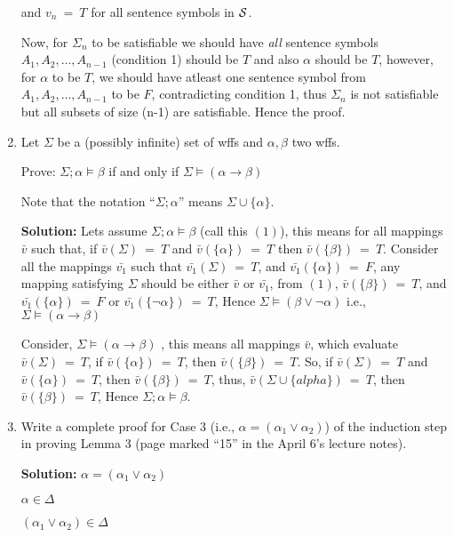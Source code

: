 \documentclass[12pt,letterpaper]{article}
\begin{document}
\begin{enumerate}
  and $v_{n}\ =\ T$ for all sentence symbols in $\cal S$.
  
  Now, for $\Sigma_{n}$ to be satisfiable we should have \textit{all} sentence symbols $A_{1}, A_{2},...,A_{n-1}$ (condition 1) should be $T$ and also $\alpha$ should be $T$, however, for $\alpha$ to be $T$, we should have atleast one sentence symbol from  $A_{1}, A_{2},...,A_{n-1}$ to be $F$, contradicting condition 1, thus $\Sigma_{n}$ is not satisfiable but all subsets of size (n-1) are satisfiable. Hence the proof.
  	
  

\item
  Let $\Sigma$ be a (possibly infinite) set of wffs and
  $\alpha,\beta$ two wffs.

  Prove: $\Sigma;\alpha\models\beta$ if and only if
  $\Sigma\models (\alpha\rightarrow\beta)$

  Note that the notation ``$\Sigma;\alpha$'' means $\Sigma\cup\{\alpha\}$.
  
  \textbf{Solution:} Lets assume $\Sigma;\alpha\models\beta$  (call this $(1)$), this means for all mappings $\bar{v}$ such that, if $\bar{v}(\Sigma)\ =\ T$ and $\bar{v}(\{\alpha\})\ =\ T$ then $\bar{v}(\{\beta\})\ =\ T$. 
  Consider all the mappings $\bar{v_{1}}$ such that $\bar{v_{1}}(\Sigma)\ =\ T$, and $\bar{v_{1}}(\{\alpha\})\ =\ F$, any mapping satisfying $\Sigma$ should be either $\bar{v}$ or $\bar{v_{1}}$, from $(1)$, $\bar{v}(\{\beta\})\ =\ T$, and $\bar{v_{1}}(\{\alpha\})\ =\ F$ or $\bar{v_{1}}(\{\lnot \alpha\})\ =\ T$, Hence $\Sigma\models (\beta \lor \lnot \alpha)$ i.e., 
$\Sigma\models (\alpha\rightarrow\beta)$

Consider, $\Sigma\models (\alpha\rightarrow\beta)$ , this means all mappings $\bar{v}$, which evaluate $\bar{v}(\Sigma)\ =\ T$, if $\bar{v}(\{\alpha\})\ =\ T$, then $\bar{v}(\{\beta\})\ =\ T$.
So, if $\bar{v}(\Sigma)\ =\ T$ and $\bar{v}(\{\alpha\})\ =\ T$, then $\bar{v}(\{\beta\})\ =\ T$, thus,
$\bar{v}(\Sigma \cup \{alpha\})\ =\ T$, then $\bar{v}(\{\beta\})\ =\ T$, Hence $\Sigma;\alpha\models\beta$.
\item
  Write a complete proof for Case 3
  (i.e., $\alpha=(\alpha_1\lor\alpha_2)$)
  of the induction step in proving
  Lemma 3 (page marked ``15'' in the April 6's lecture notes).
  
  \textbf{Solution:}
  $\alpha = (\alpha_{1} \lor \alpha_{2})$
  
  $\alpha \in \Delta$
  
  $(\alpha_{1} \lor \alpha_{2}) \in \Delta$
  

\end{enumerate}
\end{document}
